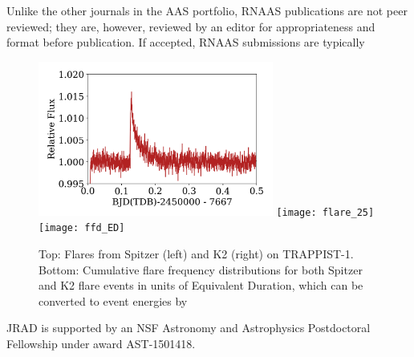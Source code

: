 \documentclass{rnaastex}
\begin{document}
Unlike the other journals in the AAS portfolio, RNAAS publications are not
peer reviewed; they are, however, reviewed by an editor for appropriateness
and format before publication. If accepted, RNAAS submissions are typically



\begin{figure}[h!]
\begin{center}
\includegraphics[height=2in]{trappist1_flare3}
\texttt{[image: flare\_25]}\\
\texttt{[image: ffd\_ED]}
\caption{Top: Flares from Spitzer (left) and K2 (right) on TRAPPIST-1. 
Bottom: Cumulative flare frequency distributions for both Spitzer and K2 flare events in units of Equivalent Duration, which can be converted to event energies by 
\label{fig:1}}
\end{center}
\end{figure}



\acknowledgments

JRAD is supported by an NSF Astronomy and Astrophysics Postdoctoral Fellowship under award AST-1501418. 



\end{document}
